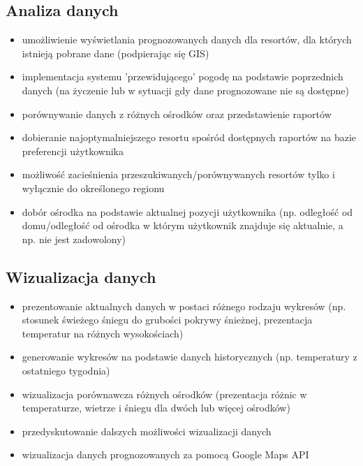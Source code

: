 \documentclass[12pt]{article}
\begin{document}
\subsection{Analiza danych}
\begin{itemize}
  \item umożliwienie wyświetlania prognozowanych danych dla resortów, dla których istnieją pobrane dane
        (podpierając się GIS)
  \item implementacja systemu 'przewidującego' pogodę na podstawie poprzednich danych (na życzenie lub w
        sytuacji gdy dane prognozowane nie są dostępne)
  \item porównywanie danych z różnych ośrodków oraz przedstawienie raportów
  \item dobieranie najoptymalniejszego resortu spośród dostępnych raportów na bazie preferencji użytkownika
  \item możliwość zacieśnienia przeszukiwanych/porównywanych resortów tylko i wyłącznie do określonego regionu
  \item dobór ośrodka na podstawie aktualnej pozycji użytkownika (np. odległość od domu/odległość od ośrodka
        w którym użytkownik znajduje się aktualnie, a np. nie jest zadowolony)
\end{itemize}

\subsection{Wizualizacja danych}
\begin{itemize}
  \item prezentowanie aktualnych danych w postaci różnego rodzaju wykresów (np. stosunek świeżego śniegu
        do grubości pokrywy śnieżnej, prezentacja temperatur na różnych wysokościach)
  \item generowanie wykresów na podstawie danych historycznych (np. temperatury z ostatniego tygodnia)
  \item wizualizacja porównawcza różnych ośrodków (prezentacja różnic w temperaturze, wietrze i śniegu dla
        dwóch lub więcej ośrodków)
  \item przedyskutowanie dalszych możliwości wizualizacji danych
  \item wizualizacja danych prognozowanych za pomocą Google Maps API
\end{itemize}
\end{document}
